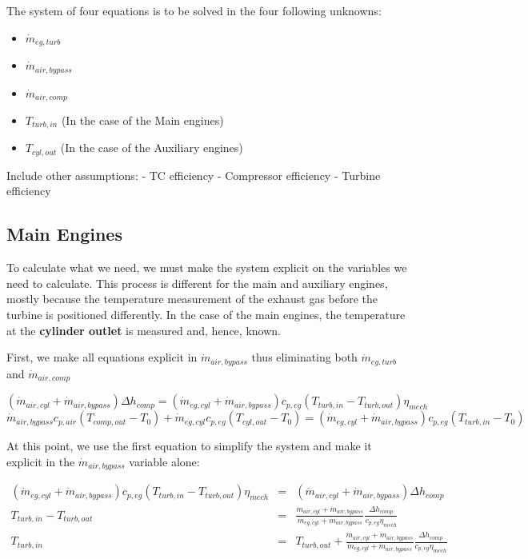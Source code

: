 The system of four equations is to be solved in the four following unknowns:
\begin{itemize}
	\item $ \dot{m}_{eg,turb} $
	\item $ \dot{m}_{air,bypass} $
	\item $ \dot{m}_{air,comp} $
	\item $ T_{turb,in} $ (In the case of the Main engines)
	\item $ T_{cyl,out} $ (In the case of the Auxiliary engines)
\end{itemize}

Include other assumptions:
- TC efficiency
- Compressor efficiency
- Turbine efficiency


\subsection{Main Engines}

To calculate what we need, we must make the system explicit on the variables we need to calculate. This process is different for the main and auxiliary engines, mostly because the temperature measurement of the exhaust gas before the turbine is positioned differently. In the case of the main engines, the temperature at the \textbf{cylinder outlet} is measured and, hence, known. 

First, we make all equations explicit in $ \dot{m}_{air,bypass} $ thus eliminating both 
$ \dot{m}_{eg,turb} $ and $ \dot{m}_{air,comp} $

$$
(\dot{m}_{air,cyl} + \dot{m}_{air,bypass}) \Delta h_{comp} = (\dot{m}_{eg,cyl} + \dot{m}_{air,bypass}) c_{p,eg} (T_{turb,in} - T_{turb,out}) \eta_{mech} 
$$
$$
\dot{m}_{air,bypass} c_{p,air} (T_{comp,out} - T_0) + \dot{m}_{eg,cyl} c_{p,eg}  (T_{cyl,out} - T_0)  = (\dot{m}_{eg,cyl} + \dot{m}_{air,bypass}) c_{p,eg} (T_{turb,in} - T_0)
$$

At this point, we use the first equation to simplify the system and make it explicit in the $ \dot{m}_{air,bypass} $ variable alone:

\begin{eqnarray*}
	(\dot{m}_{eg,cyl} + \dot{m}_{air,bypass}) c_{p,eg} (T_{turb,in} - T_{turb,out}) \eta_{mech}  & = & (\dot{m}_{air,cyl} + \dot{m}_{air,bypass}) \Delta h_{comp} \\
	T_{turb,in} - T_{turb,out} & = & \frac{\dot{m}_{air,cyl} + \dot{m}_{air,bypass}}{\dot{m}_{eg,cyl} + \dot{m}_{air,bypass}} \frac{\Delta h_{comp}}{c_{p,eg} \eta_{mech}} \\
	T_{turb,in} & = & T_{turb,out} + \frac{\dot{m}_{air,cyl} + \dot{m}_{air,bypass}}{\dot{m}_{eg,cyl} + \dot{m}_{air,bypass}} \frac{\Delta h_{comp}}{c_{p,eg} \eta_{mech}}  \\
\end{eqnarray*}

